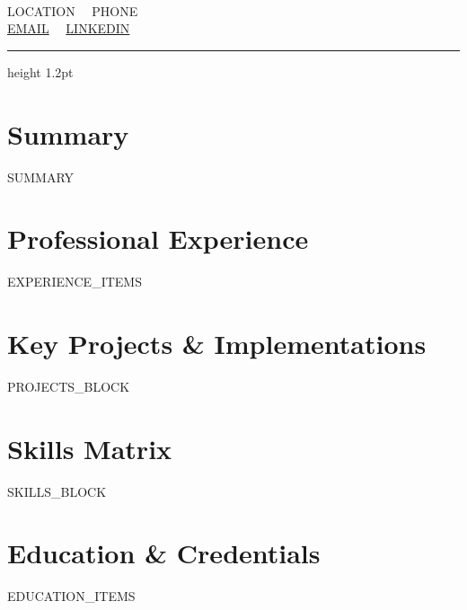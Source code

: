 \documentclass[9.5pt,letterpaper]{article}
\begin{document}
\begin{minipage}[t]{0.70\textwidth}
  {\Large \textbf{}} \ \ \textbar \ \ {\small \textbf{}}
\end{minipage}
\hfill
\begin{minipage}[t]{0.28\textwidth}
  \raggedleft \scriptsize
  {{LOCATION}} \ \textbullet \ {{PHONE}} \\
  \href{mailto:{{EMAIL}}}{{{EMAIL}}} \ \textbullet \ \href{https://{{LINKEDIN}}}{{{LINKEDIN}}}
\end{minipage}

\vspace{3pt}
{\color{charcoal}\hrule height 1.2pt}
\vspace{4pt}

\section{Summary}
\footnotesize
{{SUMMARY}}

\vspace{2pt}
\section{Professional Experience}
\footnotesize
{{EXPERIENCE_ITEMS}}

\vspace{2pt}
\section{Key Projects \& Implementations}
\footnotesize
{{PROJECTS_BLOCK}}

\vspace{4pt}

\begin{minipage}[t]{0.50\textwidth}
  \section{Skills Matrix}
  \scriptsize
  {{SKILLS_BLOCK}}
\end{minipage}
\hfill
\begin{minipage}[t]{0.47\textwidth}
  \section{Education \& Credentials}
  \scriptsize
  {{EDUCATION_ITEMS}}
\end{minipage}
\end{document}
